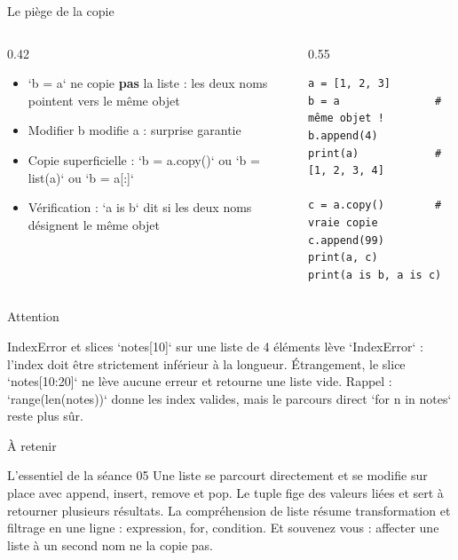 \documentclass[aspectratio=169,11pt]{beamer}
\begin{document}
\begin{frame}[fragile]{Le piège de la copie}
\begin{columns}[t]
\begin{column}{0.42\textwidth}
\begin{itemize}
  \setlength{\itemsep}{1.5pt}\setlength{\parskip}{0pt}
  \item `b = a` ne copie \textbf{pas} la liste : les deux noms pointent vers le même objet
  \item Modifier b modifie a : surprise garantie
  \item Copie superficielle : `b = a.copy()` ou `b = list(a)` ou `b = a[:]`
  \item Vérification : `a is b` dit si les deux noms désignent le même objet
\end{itemize}
\end{column}
\hspace{0.02\textwidth}
\begin{column}{0.55\textwidth}
\begin{lstlisting}[style=pysmall]
a = [1, 2, 3]
b = a               # même objet !
b.append(4)
print(a)            # [1, 2, 3, 4]

c = a.copy()        # vraie copie
c.append(99)
print(a, c)
print(a is b, a is c)
\end{lstlisting}
\end{column}
\end{columns}
\end{frame}

\begin{frame}{Attention}
\begin{alertblock}{IndexError et slices}
`notes[10]` sur une liste de 4 éléments lève `IndexError` : l'index doit être strictement inférieur à la longueur. Étrangement, le slice `notes[10:20]` ne lève aucune erreur et retourne une liste vide. Rappel : `range(len(notes))` donne les index valides, mais le parcours direct `for n in notes` reste plus sûr.
\end{alertblock}
\end{frame}

\begin{frame}{À retenir}
\begin{block}{L'essentiel de la séance 05}
Une liste se parcourt directement et se modifie sur place avec append, insert, remove et pop. Le tuple fige des valeurs liées et sert à retourner plusieurs résultats. La compréhension de liste résume transformation et filtrage en une ligne : expression, for, condition. Et souvenez vous : affecter une liste à un second nom ne la copie pas.
\end{block}
\end{frame}
\end{document}
